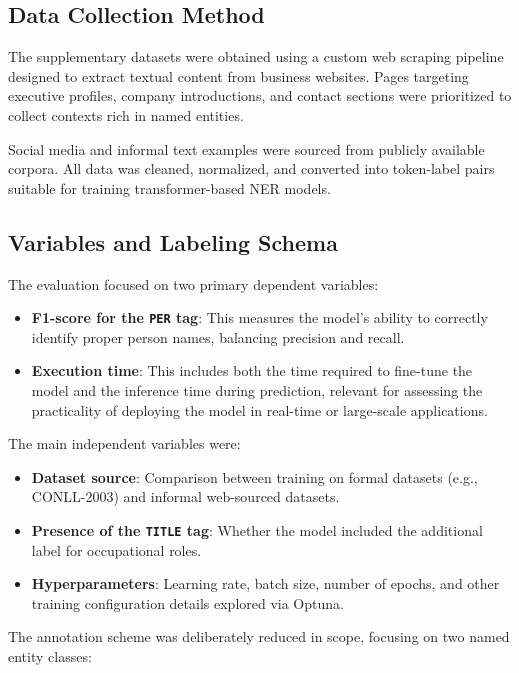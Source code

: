 \documentclass[a4paper]{usiinfbachelorproject}
\begin{document}
\subsection{Data Collection Method}

The supplementary datasets were obtained using a custom web scraping pipeline designed to extract textual content from business websites. Pages targeting executive profiles, company introductions, and contact sections were prioritized to collect contexts rich in named entities.

Social media and informal text examples were sourced from publicly available corpora. All data was cleaned, normalized, and converted into token-label pairs suitable for training transformer-based NER models.

\subsection{Variables and Labeling Schema}

The evaluation focused on two primary dependent variables:

\begin{itemize}
  \item \textbf{F1-score for the \texttt{PER} tag}: This measures the model’s ability to correctly identify proper person names, balancing precision and recall.
  \item \textbf{Execution time}: This includes both the time required to fine-tune the model and the inference time during prediction, relevant for assessing the practicality of deploying the model in real-time or large-scale applications.
\end{itemize}

The main independent variables were:

\begin{itemize}
  \item \textbf{Dataset source}: Comparison between training on formal datasets (e.g., CONLL-2003) and informal web-sourced datasets.
  \item \textbf{Presence of the \texttt{TITLE} tag}: Whether the model included the additional label for occupational roles.
  \item \textbf{Hyperparameters}: Learning rate, batch size, number of epochs, and other training configuration details explored via Optuna.
\end{itemize}

The annotation scheme was deliberately reduced in scope, focusing on two named entity classes:
\end{document}
